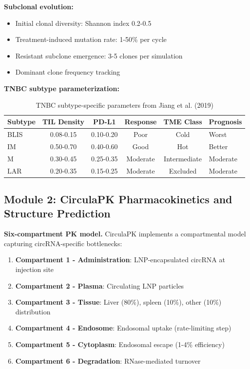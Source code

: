 \documentclass[12pt]{article}
\begin{document}
\textbf{Subclonal evolution:}
\begin{itemize}
\item Initial clonal diversity: Shannon index 0.2-0.5
\item Treatment-induced mutation rate: 1-50\% per cycle
\item Resistant subclone emergence: 3-5 clones per simulation
\item Dominant clone frequency tracking
\end{itemize}

\textbf{TNBC subtype parameterization:}

\begin{table}[htbp]
\centering
\caption{TNBC subtype-specific parameters from Jiang et al. (2019)}
\label{tab:subtypes}
\begin{tabular}{lccccl}
\toprule
Subtype & TIL Density & PD-L1 & Response & TME Class & Prognosis \\
\midrule
BLIS & 0.08-0.15 & 0.10-0.20 & Poor & Cold & Worst \\
IM & 0.50-0.70 & 0.40-0.60 & Good & Hot & Better \\
M & 0.30-0.45 & 0.25-0.35 & Moderate & Intermediate & Moderate \\
LAR & 0.20-0.35 & 0.15-0.25 & Moderate & Excluded & Moderate \\
\bottomrule
\end{tabular}
\end{table}

\subsection{Module 2: CirculaPK Pharmacokinetics and Structure Prediction}

\textbf{Six-compartment PK model.} CirculaPK implements a compartmental model capturing circRNA-specific bottlenecks:

\begin{enumerate}
\item \textbf{Compartment 1 - Administration}: LNP-encapsulated circRNA at injection site
\item \textbf{Compartment 2 - Plasma}: Circulating LNP particles
\item \textbf{Compartment 3 - Tissue}: Liver (80\%), spleen (10\%), other (10\%) distribution
\item \textbf{Compartment 4 - Endosome}: Endosomal uptake (rate-limiting step)
\item \textbf{Compartment 5 - Cytoplasm}: Endosomal escape (1-4\% efficiency)
\item \textbf{Compartment 6 - Degradation}: RNase-mediated turnover
\end{enumerate}
\end{document}
